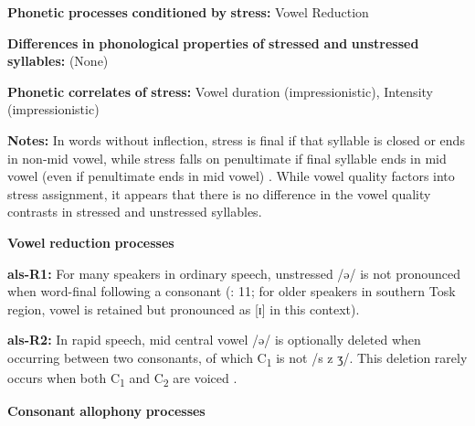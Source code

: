\documentclass[output=paper]{langsci/langscibook}
\begin{document}
\begin{styleBody}
\textbf{Phonetic} \textbf{processes} \textbf{conditioned} \textbf{by} \textbf{stress:} Vowel Reduction
\end{styleBody}

\begin{styleBody}
\textbf{Differences} \textbf{in} \textbf{phonological} \textbf{properties} \textbf{of} \textbf{stressed} \textbf{and} \textbf{unstressed} \textbf{syllables:} (None)
\end{styleBody}

\begin{styleBody}
\textbf{Phonetic} \textbf{correlates} \textbf{of} \textbf{stress:} Vowel duration (impressionistic), Intensity (impressionistic)
\end{styleBody}

\begin{styleBody}
\textbf{Notes:} In words without inflection, stress is final if that syllable is closed or ends in non-mid vowel, while stress falls on penultimate if final syllable ends in mid vowel (even if penultimate ends in mid vowel) \citep{Trommer2013}. While vowel quality factors into stress assignment, it appears that there is no difference in the vowel quality contrasts in stressed and unstressed syllables.
\end{styleBody}

\begin{styleBody}
\textbf{Vowel} \textbf{reduction} \textbf{processes}
\end{styleBody}

\begin{styleBody}
\textbf{als-R1:} For many speakers in ordinary speech, unstressed /ə/ is not pronounced when word-final following a consonant (\citealt{NewmarkEtAl1982}: 11; for older speakers in southern Tosk region, vowel is retained but pronounced as [ɪ] in this context).
\end{styleBody}

\begin{styleBody}
\textbf{als-R2:} In rapid speech, mid central vowel /ə/ is optionally deleted when occurring between two consonants, of which C\textsubscript{1} is not /s z ʒ/. This deletion rarely occurs when both C\textsubscript{1} and C\textsubscript{2} are voiced \citep[21-2]{Klippenstein2010}.
\end{styleBody}

\begin{styleBody}
\textbf{Consonant} \textbf{allophony} \textbf{processes}
\end{styleBody}
\end{document}
